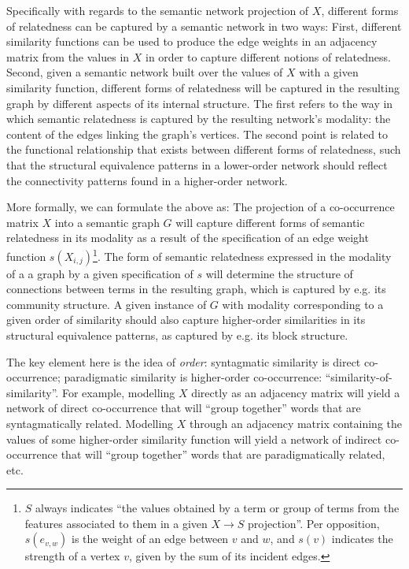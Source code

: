 Specifically with regards to the semantic network projection of $X$, different forms of relatedness can be captured by a semantic network in two ways:
First, different similarity functions can be used to produce the edge weights in an adjacency matrix from the values in $X$ in order to capture different notions of relatedness.
Second, given a semantic network built over the values of $X$ with a given similarity function, different forms of relatedness will be captured in the resulting graph by different aspects of its internal structure.
The first refers to the way in which semantic relatedness is captured by the resulting network's modality: the content of the edges linking the graph's vertices.
The second point is related to the functional relationship that exists between different forms of relatedness, such that the structural equivalence patterns in a lower-order network should reflect the connectivity patterns found in a higher-order network.

More formally, we can formulate the above as:
The projection of a co-occurrence matrix $X$ into a semantic graph $G$ will capture different forms of semantic relatedness in its modality as a result of the specification of an edge weight function $s(X_{i,j})$\footnote{
    $S$ always indicates ``the values obtained by a term or group of terms from the features associated to them in a given $X \rightarrow S$ projection''.
    Per opposition, $s( e_{v,w} )$ is the weight of an edge between $v$ and $w$, and $s(v)$ indicates the strength of a vertex $v$, given by the sum of its incident edges.
}.
The form of semantic relatedness expressed in the modality of a a graph by a given specification of $s$ will determine the structure of connections between terms in the resulting graph, which is captured by e.g. its community structure.
A given instance of $G$ with modality corresponding to a given order of similarity should also capture higher-order similarities in its structural equivalence patterns, as captured by e.g. its block structure.

The key element here is the idea of \emph{order}: syntagmatic similarity is direct co-occurrence; paradigmatic similarity is higher-order co-occurrence: ``similarity-of-similarity''.
For example, modelling $X$ directly as an adjacency matrix will yield a network of direct co-occurrence that will ``group together'' words that are syntagmatically related.
Modelling $X$ through an adjacency matrix containing the values of some higher-order similarity function will yield a network of indirect co-occurrence that will ``group together'' words that are paradigmatically related, etc.

